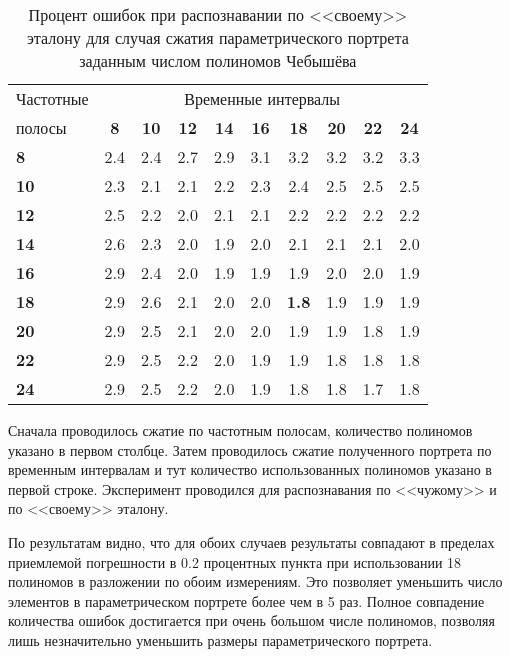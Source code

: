 \begin{table}[h]
	\centering
	\caption{Процент ошибок при распознавании по <<своему>> эталону для случая сжатия параметрического портрета заданным числом полиномов Чебышёва}
	\label{tab:chebyshevTrain}
	\begin{tabular}{| l | c | c | c | c | c | c | c | c | c |}
		\hline
		Частотные & \multicolumn{9}{c|}{Временные интервалы} \\
		\hhline{~---------}
	 	полосы & \phantom{0} \textbf{8} \phantom{0} & \phantom{0}\textbf{10} \phantom{0} & \phantom{0}\textbf{12} \phantom{0} & \phantom{0}\textbf{14} \phantom{0} & \phantom{0}\textbf{16} \phantom{0} & \phantom{0}\textbf{18} \phantom{0} & \phantom{0}\textbf{20} \phantom{0} & \phantom{0}\textbf{22} \phantom{0} & \phantom{0}\textbf{24} \phantom{0} \\
		\hline
		\textbf{8}  & 2.4 & 2.4 & 2.7 & 2.9 & 3.1 & 3.2 & 3.2 & 3.2 & 3.3 \\
		\textbf{10} & 2.3 & 2.1 & 2.1 & 2.2 & 2.3 & 2.4 & 2.5 & 2.5 & 2.5 \\
		\textbf{12} & 2.5 & 2.2 & 2.0 & 2.1 & 2.1 & 2.2 & 2.2 & 2.2 & 2.2 \\
		\textbf{14} & 2.6 & 2.3 & 2.0 & 1.9 & 2.0 & 2.1 & 2.1 & 2.1 & 2.0 \\
		\textbf{16} & 2.9 & 2.4 & 2.0 & 1.9 & 1.9 & 1.9 & 2.0 & 2.0 & 1.9 \\
		\textbf{18} & 2.9 & 2.6 & 2.1 & 2.0 & 2.0 & \textbf{1.8} & 1.9 & 1.9 & 1.9 \\
		\textbf{20} & 2.9 & 2.5 & 2.1 & 2.0 & 2.0 & 1.9 & 1.9 & 1.8 & 1.9 \\
		\textbf{22} & 2.9 & 2.5 & 2.2 & 2.0 & 1.9 & 1.9 & 1.8 & 1.8 & 1.8 \\
		\textbf{24} & 2.9 & 2.5 & 2.2 & 2.0 & 1.9 & 1.8 & 1.8 & 1.7 & 1.8 \\
		\hline
	\end{tabular}
\end{table}

Сначала проводилось сжатие по частотным полосам, количество полиномов указано в первом столбце.
Затем проводилось сжатие полученного портрета по временным интервалам и тут количество использованных полиномов указано в первой строке.
Эксперимент проводился для распознавания по <<чужому>> и по <<своему>> эталону.

По результатам видно, что для обоих случаев результаты совпадают в пределах приемлемой погрешности в 0.2 процентных пункта при использовании 18 полиномов в разложении по обоим измерениям.
Это позволяет уменьшить число элементов в параметрическом портрете более чем в 5 раз.
Полное совпадение количества ошибок достигается при очень большом числе полиномов, позволяя лишь незначительно уменьшить размеры параметрического портрета.

